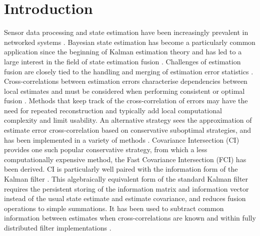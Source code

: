 \documentclass[letterpaper, 10 pt, conference]{ieeeconf}  %
\begin{document}
\section{Introduction}
Sensor data processing and state estimation have been increasingly prevalent in networked systems \cite{ligginsDistributedDataFusion2012,chongFortyYearsDistributed2017}. Bayesian state estimation has become a particularly common application since the beginning of Kalman estimation theory \cite{kalmanNewApproachLinear1960} and has led to a large interest in the field of state estimation fusion \cite{willnerKalmanFilterAlgorithms1976,chongHierarchicalEstimation1979,chongDistributedTrackingDistributed1986,hashemipourDecentralizedStructuresParallel1988,grimeDataFusionDecentralized1994}. Challenges of estimation fusion are closely tied to the handling and merging of estimation error statistics \cite{fouratiMultisensorDataFusion2017}. Cross-correlations between estimation errors characterise dependencies between local estimates and must be considered when performing consistent or optimal fusion \cite{bar-shalomTracktotrackCorrelationProblem1981,sunMultisensorOptimalInformation2004}. Methods that keep track of the cross-correlation of errors may have the need for repeated reconstruction \cite{steinbringOptimalSamplebasedFusion2016} and typically add local computational complexity and limit usability. An alternative strategy sees the approximation of estimate error cross-correlation based on conservative suboptimal strategies, and has been implemented in a variety of methods \cite{carlsonFederatedFilterFaulttolerant1988,julierNondivergentEstimationAlgorithm1997,sijsStateFusionUnknown2012,noackDecentralizedDataFusion2017,niehsenInformationFusionBased2002,frankenImprovedFastCovariance2005}. Covariance Intersection (CI) \cite{julierNondivergentEstimationAlgorithm1997} provides one such popular conservative strategy, from which a less computationally expensive method, the Fast Covariance Intersection (FCI) \cite{niehsenInformationFusionBased2002} has been derived. CI is particularly well paired with the information form of the Kalman filter \cite{mutambaraDecentralizedEstimationControl1998}. This algebraically equivalent form of the standard Kalman filter requires the persistent storing of the information matrix and information vector instead of the usual state estimate and estimate covariance, and reduces fusion operations to simple summations. It has been used to subtract common information between estimates when cross-correlations are known \cite{grimeDataFusionDecentralized1994} and within fully distributed filter implementations \cite{pfaffInformationFormDistributed2017}.
\end{document}
